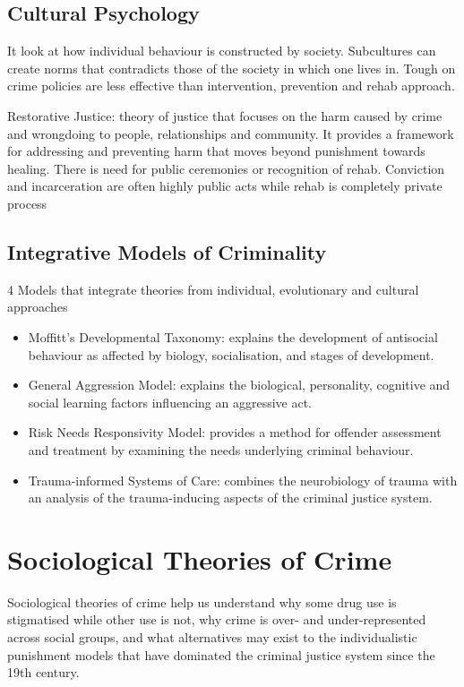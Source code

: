\documentclass{article}
\begin{document}
\subsection{Cultural Psychology}

It look at how individual behaviour is constructed by society. Subcultures can create norms that contradicts those of the society in which one lives in. Tough on crime policies are less effective than intervention, prevention and rehab approach.

Restorative Justice: theory of justice that focuses on the harm caused by crime and wrongdoing to people, relationships and community. It provides a framework for addressing and preventing harm that moves beyond punishment towards healing. There is need for public ceremonies or recognition of rehab. Conviction and incarceration are often highly public acts while rehab is completely private process

\subsection{Integrative Models of Criminality}
4 Models that integrate theories from individual, evolutionary and cultural approaches

\begin{itemize}
    \item Moffitt’s Developmental Taxonomy: explains the development of antisocial behaviour as affected by biology, socialisation, and stages of development. 
    \item General Aggression Model: explains the biological, personality, cognitive and social learning factors influencing an aggressive act. 
    \item Risk Needs Responsivity Model: provides a method for offender assessment and treatment by examining the needs underlying criminal behaviour. 
    \item Trauma-informed Systems of Care: combines the neurobiology of trauma with an analysis of the trauma-inducing aspects of the criminal justice system.
\end{itemize}

\section{Sociological Theories of Crime}

Sociological theories of crime help us understand why some drug use is stigmatised while other use is not, why crime is over- and under-represented across social groups, and what alternatives may exist to the individualistic punishment models that have dominated the criminal justice system since the 19th century.
\end{document}
